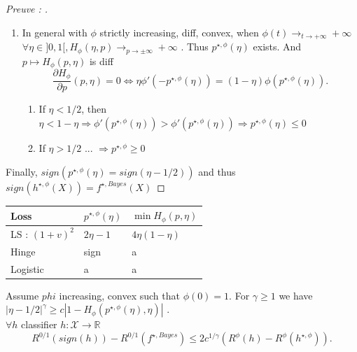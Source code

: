 \begin{proof}[Preuve : ]
\begin{enumerate}
        \item In general with $ \phi  $ strictly increasing, diff, convex, when $ \phi (t) \to _{t \to +\infty } + \infty $  $ \forall \eta \in ]0, 1[, H_\phi (\eta , p) \to _{p \to  \pm \infty } + \infty $ . Thus $ p^{\star , \phi }(\eta ) $ exists. And $ p \mapsto H_\phi (p, \eta ) $ is diff 
        \[
            \frac{\partial H_{\phi }}{\partial p} (p , \eta ) = 0 \Leftrightarrow \eta \phi ' (-p^{\star , \phi }(\eta )) = (1 - \eta ) \phi (p^{\star , \phi } (\eta )) 
        .\]
        \begin{enumerate}
            \item If $ \eta < 1/2 $, then $ \eta < 1 - \eta \Rightarrow  \phi ' ( p^{\star , \phi } (\eta )) > \phi ' (p^{\star , \phi } (\eta )) \Rightarrow  p^{\star , \phi } ( \eta ) \leq 0$ 
            \item If $ \eta > 1/2 $ ... $ \Rightarrow p^{\star , \phi } \geq 0 $ 
        \end{enumerate}
    \end{enumerate}
    Finally, $ sign(p^{\star , \phi } ( \eta ) = sign( \eta - 1/2) ) $ and thus $ sign(h^{\star , \phi } (X) ) = f^{\star , Bayes } (X)$  

\end{proof}

\begin{table}[!ht]
    \centering
    \begin{tabular}{|l|l|l|}
    \hline
        Loss & $ p^{\star , \phi }(\eta ) $  & $ \min H_\phi (p, \eta ) $  \\ \hline
        LS : $ (1 + v)^2 $  & $ 2 \eta - 1 $  & $ 4 \eta (1 - \eta )  $  \\ \hline
        Hinge & sign & a \\ \hline
        Logistic & a & a \\ \hline
    \end{tabular}
    \label{table:loss}
\end{table}


\begin{lem}[Zhang]
    Assume $ phi $ increasing, convex such that $ \phi (0) = 1 $. For $ \gamma \geq 1 $ we have $ \left| \eta  - 1/2 \right|^\gamma  \geq c \left| 1 - H_\phi (p^{\star , \phi }(\eta ), \eta ) \right|   $ . \\
    $ \forall h $ classifier $ h: \mathcal{X} \to \mathbb{R} $ 
    \[
        R^{0/1} (sign(h)) - R^{0/1}(f^{\star , Bayes}) \leq 2 c ^{1/\gamma }(R^\phi (h) - R^\phi (h^{\star , \phi }))
    .\]
\end{lem}

